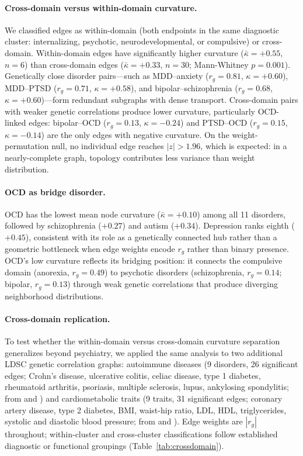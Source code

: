 \documentclass{article}
\begin{document}
\paragraph{Cross-domain versus within-domain curvature.} We classified edges as within-domain (both endpoints in the same diagnostic cluster: internalizing, psychotic, neurodevelopmental, or compulsive) or cross-domain. Within-domain edges have significantly higher curvature ($\bar{\kappa} = +0.55$, $n = 6$) than cross-domain edges ($\bar{\kappa} = +0.33$, $n = 30$; Mann-Whitney $p = 0.001$). Genetically close disorder pairs---such as MDD--anxiety ($r_g = 0.81$, $\kappa = +0.60$), MDD--PTSD ($r_g = 0.71$, $\kappa = +0.58$), and bipolar--schizophrenia ($r_g = 0.68$, $\kappa = +0.60$)---form redundant subgraphs with dense transport. Cross-domain pairs with weaker genetic correlations produce lower curvature, particularly OCD-linked edges: bipolar--OCD ($r_g = 0.13$, $\kappa = -0.24$) and PTSD--OCD ($r_g = 0.15$, $\kappa = -0.14$) are the only edges with negative curvature. On the weight-permutation null, no individual edge reaches $|z| > 1.96$, which is expected: in a nearly-complete graph, topology contributes less variance than weight distribution.

\paragraph{OCD as bridge disorder.} OCD has the lowest mean node curvature ($\bar{\kappa} = +0.10$) among all 11 disorders, followed by schizophrenia ($+0.27$) and autism ($+0.34$). Depression ranks eighth ($+0.45$), consistent with its role as a genetically connected hub rather than a geometric bottleneck when edge weights encode $r_g$ rather than binary presence. OCD's low curvature reflects its bridging position: it connects the compulsive domain (anorexia, $r_g = 0.49$) to psychotic disorders (schizophrenia, $r_g = 0.14$; bipolar, $r_g = 0.13$) through weak genetic correlations that produce diverging neighborhood distributions.

\paragraph{Cross-domain replication.} To test whether the within-domain versus cross-domain curvature separation generalizes beyond psychiatry, we applied the same analysis to two additional LDSC genetic correlation graphs: autoimmune diseases (9 disorders, 26 significant edges; Crohn's disease, ulcerative colitis, celiac disease, type 1 diabetes, rheumatoid arthritis, psoriasis, multiple sclerosis, lupus, ankylosing spondylitis; from \citealt{buliksullivan2015atlas} and \citealt{ellinghaus2016analysis}) and cardiometabolic traits (9 traits, 31 significant edges; coronary artery disease, type 2 diabetes, BMI, waist-hip ratio, LDL, HDL, triglycerides, systolic and diastolic blood pressure; from \citealt{buliksullivan2015atlas} and \citealt{evangelou2018genetic}). Edge weights are $|r_g|$ throughout; within-cluster and cross-cluster classifications follow established diagnostic or functional groupings (Table~\ref{tab:crossdomain}).
\end{document}
